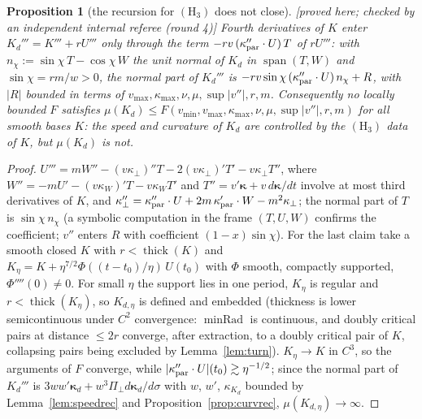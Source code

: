 \documentclass[10pt,a4paper]{article}
\theoremstyle{plain}
\newtheorem{proposition}[theorem]{Proposition}
\theoremstyle{definition}
\theoremstyle{remark}
\newcommand{\thick}{\operatorname{thick}}
\newcommand{\minRad}{\operatorname{minRad}}
\newcommand{\status}[1]{\textsf{\small [#1]}}
\begin{document}
\begin{proposition}[the recursion for $(\mathrm H_3)$ does not close]\label{prop:noclose}\status{proved here; checked by an independent internal referee (round 4)}
Fourth derivatives of $K$ enter $K_d'''=K'''+rU'''$ only through the term $-rv\,(\kappa_{\rm par}''\cdot U)\,T$ of $rU'''$: with $n_\chi:=\sin\chi\,T-\cos\chi\,W$ the unit normal of $K_d$ in $\operatorname{span}(T,W)$ and $\sin\chi=rm/w>0$, the normal part of $K_d'''$ is $-rv\sin\chi\,(\kappa_{\rm par}''\cdot U)\,n_\chi+R$, with $|R|$ bounded in terms of $v_{\max},\kappa_{\max},\nu,\mu,\sup|v''|,r,m$. Consequently no locally bounded $F$ satisfies $\mu(K_d)\le F(v_{\min},v_{\max},\kappa_{\max},\nu,\mu,\sup|v''|,r,m)$ for all smooth bases $K$: the speed and curvature of $K_d$ are controlled by the $(\mathrm H_3)$ data of $K$, but $\mu(K_d)$ is not.
\end{proposition}
\begin{proof}
$U'''=mW''-(v\kappa_\perp)''T-2(v\kappa_\perp)'T'-v\kappa_\perp T''$, where $W''=-mU'-(v\kappa_W)'T-v\kappa_WT'$ and $T''=v'\boldsymbol\kappa+v\,d\boldsymbol\kappa/dt$ involve at most third derivatives of $K$, and $\kappa_\perp''=\kappa_{\rm par}''\cdot U+2m\,\kappa_{\rm par}'\cdot W-m^2\kappa_\perp$; the normal part of $T$ is $\sin\chi\,n_\chi$ (a symbolic computation in the frame $(T,U,W)$ confirms the coefficient; $v''$ enters $R$ with coefficient $(1-x)\sin\chi$). For the last claim take a smooth closed $K$ with $r<\thick(K)$ and $K_\eta=K+\eta^{7/2}\Phi((t-t_0)/\eta)\,U(t_0)$ with $\Phi$ smooth, compactly supported, $\Phi''''(0)\ne0$. For small $\eta$ the support lies in one period, $K_\eta$ is regular and $r<\thick(K_\eta)$, so $K_{d,\eta}$ is defined and embedded (thickness is lower semicontinuous under $C^2$ convergence: $\minRad$ is continuous, and doubly critical pairs at distance $\le2r$ converge, after extraction, to a doubly critical pair of $K$, collapsing pairs being excluded by Lemma~\ref{lem:turn}). $K_\eta\to K$ in $C^3$, so the arguments of $F$ converge, while $|\kappa_{\rm par}''\cdot U|(t_0)\gtrsim\eta^{-1/2}$; since the normal part of $K_d'''$ is $3ww'\boldsymbol\kappa_d+w^3\Pi_\perp d\boldsymbol\kappa_d/d\sigma$ with $w$, $w'$, $\kappa_{K_d}$ bounded by Lemma~\ref{lem:speedrec} and Proposition~\ref{prop:curvrec}, $\mu(K_{d,\eta})\to\infty$.
\end{proof}
\end{document}
